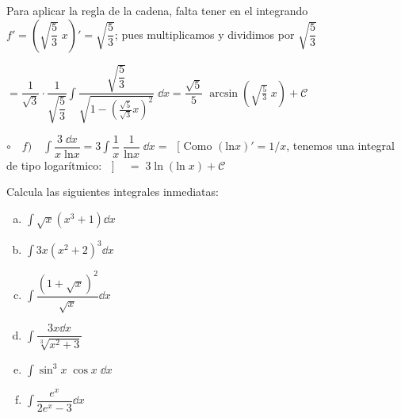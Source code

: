 \begin{proofw}
	 Para aplicar la regla de la cadena, falta tener en el integrando $f'=\left( \sqrt{\dfrac 5 3 }\; x \right)'=\sqrt{\dfrac 5 3}$;  pues multiplicamos y dividimos por $\sqrt{\dfrac 5 3}\; $ 
	
	$ = \dfrac {1}{\sqrt{3}}\cdot \dfrac {1}{\sqrt{\dfrac 5 3}} \displaystyle \int \dfrac {\sqrt{\dfrac 5 3}}{ \sqrt {1- \left( \frac {\sqrt 5} {\sqrt 3} x \right)^2} } \; \dd x = \dfrac {\sqrt{5}}{5	}\; \arcsin \left(\sqrt{\frac 5 3}\; x  \right) + \mathcal C$
	
	$\circ \quad f) \quad  \displaystyle \int \dfrac {3\; \dd x}{x\; \mathrm{ln} x} = \displaystyle 3 \int \dfrac {1 }{x}\; \dfrac {1}{\mathrm{ln} x} \; \dd x =\; $ [ Como  $(\mathrm{ln} x)'= 1/x$, tenemos una integral de tipo logarítmico:$\;\;$ ] $\;\; \; =\; 3\;  \mathrm {ln}\;  (\mathrm{ln} \;  x) + \mathcal C$
	
	\end{proofw}

\begin{ejre} Calcula las siguientes integrales inmediatas:
\begin{multicols}{2}
\begin{enumerate}[a) ]
	\item $\displaystyle \int \sqrt{x} (x^3+1) \dd x$ 
	\item $\displaystyle \int 3x (x^2+2)^3 \dd x$
	\item $\displaystyle \int \dfrac {(1+\sqrt x)^2}{\sqrt x} \dd x$
	\item $\displaystyle \int \dfrac {3x\dd x}{\sqrt[3]{x^2+3}}$
	\item $\displaystyle \int \sin^3 x \; \cos x \; \dd x$
	\item $\displaystyle \int \dfrac {e^x}{2e^x-3} \dd x$
\end{enumerate}	
\end{multicols}
\end{ejre}
	
